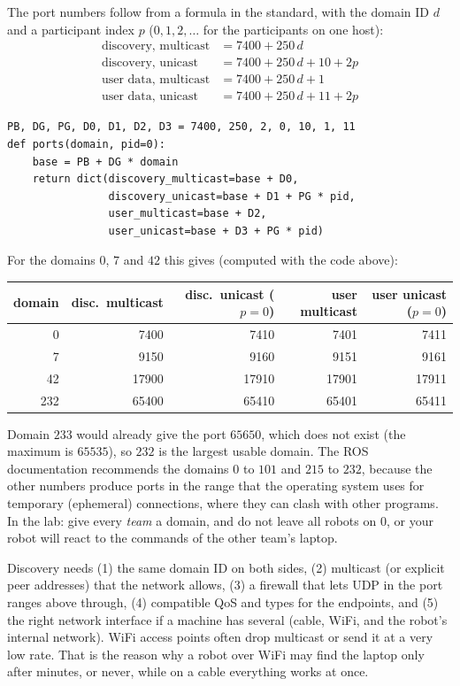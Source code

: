 The port numbers follow from a formula in the standard, with the domain ID $d$ and a participant index $p$ ($0,1,2,\ldots$ for the participants on one host):
\begin{align*}
\text{discovery, multicast} &= 7400+250\,d\\
\text{discovery, unicast} &= 7400+250\,d+10+2p\\
\text{user data, multicast} &= 7400+250\,d+1\\
\text{user data, unicast} &= 7400+250\,d+11+2p
\end{align*}
\begin{verbatim}
PB, DG, PG, D0, D1, D2, D3 = 7400, 250, 2, 0, 10, 1, 11
def ports(domain, pid=0):
    base = PB + DG * domain
    return dict(discovery_multicast=base + D0,
                discovery_unicast=base + D1 + PG * pid,
                user_multicast=base + D2,
                user_unicast=base + D3 + PG * pid)
\end{verbatim}
For the domains $0$, $7$ and $42$ this gives (computed with the code above):
\begin{center}
\renewcommand{\arraystretch}{1.2}
\begin{tabular}{rrrrr}
\textbf{domain} & \textbf{disc.\ multicast} & \textbf{disc.\ unicast} ($p=0$) & \textbf{user multicast} & \textbf{user unicast} ($p=0$)\\ \hline
0 & 7400 & 7410 & 7401 & 7411\\
7 & 9150 & 9160 & 9151 & 9161\\
42 & 17900 & 17910 & 17901 & 17911\\
232 & 65400 & 65410 & 65401 & 65411\\
\end{tabular}
\end{center}
Domain $233$ would already give the port $65650$, which does not exist (the maximum is $65535$), so $232$ is the largest usable domain. The ROS documentation recommends the domains $0$ to $101$ and $215$ to $232$, because the other numbers produce ports in the range that the operating system uses for temporary (ephemeral) connections, where they can clash with other programs. In the lab: give every \emph{team} a domain, and do not leave all robots on $0$, or your robot will react to the commands of the other team's laptop.

\begin{keyidea}
Discovery needs (1) the same domain ID on both sides, (2) multicast (or explicit peer addresses) that the network allows, (3) a firewall that lets UDP in the port ranges above through, (4) compatible QoS and types for the endpoints, and (5) the right network interface if a machine has several (cable, WiFi, and the robot's internal network). WiFi access points often drop multicast or send it at a very low rate. That is the reason why a robot over WiFi may find the laptop only after minutes, or never, while on a cable everything works at once.
\end{keyidea}

